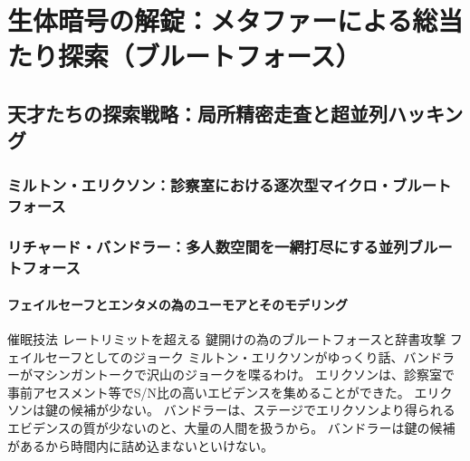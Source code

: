 \chapter{生体暗号の解錠：メタファーによる総当たり探索（ブルートフォース）}
\section{天才たちの探索戦略：局所精密走査と超並列ハッキング}
\subsection{ミルトン・エリクソン：診察室における逐次型マイクロ・ブルートフォース}
\subsection{リチャード・バンドラー：多人数空間を一網打尽にする並列ブルートフォース}
\subsubsection{フェイルセーフとエンタメの為のユーモアとそのモデリング}
催眠技法
レートリミットを超える
鍵開けの為のブルートフォースと辞書攻撃
フェイルセーフとしてのジョーク
ミルトン・エリクソンがゆっくり話、バンドラーがマシンガントークで沢山のジョークを喋るわけ。
エリクソンは、診察室で事前アセスメント等でS/N比の高いエビデンスを集めることができた。
エリクソンは鍵の候補が少ない。
バンドラーは、ステージでエリクソンより得られるエビデンスの質が少ないのと、大量の人間を扱うから。
バンドラーは鍵の候補があるから時間内に詰め込まないといけない。


